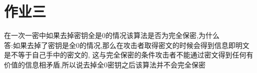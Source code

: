 \section{作业三}
    在一次一密中如果去掉密钥全是0的情况该算法是否为完全保密,为什么\\
    答:如果去掉了密钥是全0的情况,那么在攻击者取得密文的时候会得到信息即明文是不等于自己手中的密文的,
    这与完全保密的条件攻击者不能通过密文得到任何有价值的信息相矛盾,所以说去掉全0密钥之后该算法并不会完全保密